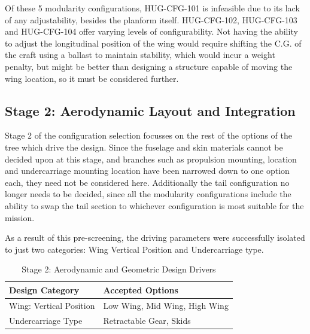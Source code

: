 Of these 5 modularity configurations, HUG-CFG-101 is infeasible due to its lack of any adjustability, besides the planform itself. HUG-CFG-102, HUG-CFG-103 and HUG-CFG-104 offer varying levels of configurability. Not having the ability to adjust the longitudinal position of the wing would require shifting the C.G. of the craft using a ballast to maintain stability, which would incur a weight penalty, but might be better than designing a structure capable of moving the wing location, so it must be considered further.

\subsection{Stage 2: Aerodynamic Layout and Integration}
\label{sec:stage_2_integration}

Stage 2 of the configuration selection focusses on the rest of the options of the tree which drive the design. Since the fuselage and skin materials cannot be decided upon at this stage, and branches such as propulsion mounting, location and undercarriage mounting location have been narrowed down to one option each, they need not be considered here. Additionally the tail configuration no longer needs to be decided, since all the modularity configurations include the ability to swap the tail section to whichever configuration is most suitable for the mission.  

As a result of this pre-screening, the driving parameters were successfully isolated to just two categories: Wing Vertical Position and Undercarriage type.

\begin{table}[H]
    \centering
    \caption{Stage 2: Aerodynamic and Geometric Design Drivers}
    \label{tab:stage2_design_options}
    \renewcommand{\arraystretch}{1.2}
    \begin{tabular}{|l|p{10cm}|}
        \hline
        \textbf{Design Category} & \textbf{Accepted Options} \\ \hline \hline
        Wing: Vertical Position & Low Wing, Mid Wing, High Wing \\ \hline
        Undercarriage Type & Retractable Gear, Skids \\ \hline
    \end{tabular}
\end{table}

